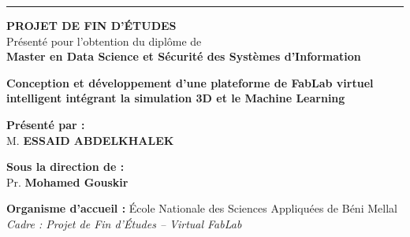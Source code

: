 \documentclass[12pt,a4paper]{report}
\begin{document}
\begin{titlepage}
\begin{center}
\vspace{0.35cm}
\textcolor{RuleColor}{\rule{0.86\linewidth}{0.7pt}}
\vspace{0.6cm}

{\Large\bfseries\color{ChapterColor}\MakeUppercase{Projet de Fin d'Études}}\\[0.28cm]
{\normalsize Présenté pour l'obtention du diplôme de}\\[0.18cm]
{\large\bfseries Master en Data Science et Sécurité des Systèmes d'Information}\\[0.72cm]

\begin{tcolorbox}[
  enhanced,
  width=0.88\textwidth,
  colframe=ChapterColor,
  colback=ChapterColor!4,
  arc=0pt,
  boxrule=1.1pt,
  left=8mm,
  right=8mm,
  top=5mm,
  bottom=5mm,
  center
]
  \centering\Large\bfseries\color{ChapterColor}
  Conception et développement d'une plateforme de FabLab virtuel intelligent intégrant la simulation 3D et le Machine Learning
\end{tcolorbox}

\vspace{0.62cm}

\begin{minipage}[t]{0.42\textwidth}
  \raggedright
  \textbf{Présenté par :}\\[4pt]
  M. \textbf{ESSAID ABDELKHALEK}
\end{minipage}
\hfill
\begin{minipage}[t]{0.42\textwidth}
  \raggedleft
  \textbf{Sous la direction de :}\\[4pt]
  Pr. \textbf{Mohamed Gouskir}
\end{minipage}

\vspace{0.62cm}

\begin{tcolorbox}[
  enhanced,
  width=0.88\textwidth,
  colback=white,
  colframe=ChapterColor!45,
  arc=0pt,
  boxrule=0.45pt,
  left=6mm,
  right=6mm,
  top=3mm,
  bottom=3mm,
  center
]
  \begin{minipage}[c]{0.95\textwidth}
    \raggedright
    \small\textbf{Organisme d'accueil :} École Nationale des Sciences Appliquées de Béni Mellal\\[4pt]
    \textit{Cadre : Projet de Fin d'Études -- Virtual FabLab}
  \end{minipage}
\end{tcolorbox}

\vspace{0.45cm}


\end{center}
\end{titlepage}
\end{document}
